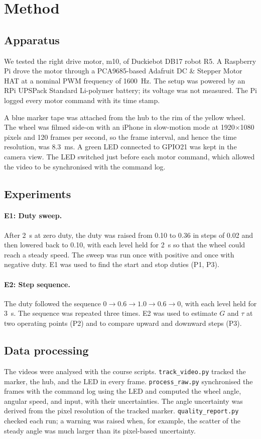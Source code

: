 \section{Method}
\label{sec:method}

\subsection{Apparatus}
We tested the right drive motor, m10, of Duckiebot DB17 robot R5. A Raspberry Pi drove the motor through a PCA9685-based Adafruit DC \& Stepper Motor HAT at a nominal PWM frequency of 1600~Hz. The setup was powered by an RPi UPSPack Standard Li-polymer battery; its voltage was not measured. The Pi logged every motor command with its time stamp.

A blue marker tape was attached from the hub to the rim of the yellow wheel. The wheel was filmed side-on with an iPhone in slow-motion mode at 1920$\times$1080 pixels and 120 frames per second, so the frame interval, and hence the time resolution, was 8.3~ms.
A green LED connected to GPIO21 was kept in the camera view. The LED switched just before each motor command, which allowed the video to be synchronised with the command log.

\subsection{Experiments}
\paragraph{E1: Duty sweep.} After 2~s at zero duty, the duty was raised from 0.10 to 0.36 in steps of 0.02 and then lowered back to 0.10, with each level held for 2~s so that the wheel could reach a steady speed. The sweep was run once with positive and once with negative duty.
E1 was used to find the start and stop duties (P1, P3).

\paragraph{E2: Step sequence.} The duty followed the sequence $0\to0.6\to1.0\to0.6\to0$, with each level held for 3~s.
The sequence was repeated three times. E2 was used to estimate $G$ and $\tau$ at two operating points (P2) and to compare upward and downward steps (P3).

\subsection{Data processing}
The videos were analysed with the course scripts. \texttt{track\_video.py} tracked the marker, the hub, and the LED in every frame. \texttt{process\_raw.py} synchronised the frames with the command log using the LED and computed the wheel angle, angular speed, and input, with their uncertainties. The angle uncertainty was derived from the pixel resolution of the tracked marker. \texttt{quality\_report.py} checked each run; a warning was raised when, for example, the scatter of the steady angle was much larger than its pixel-based uncertainty.

